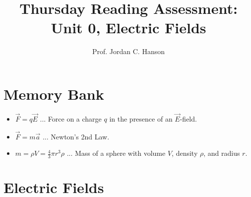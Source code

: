 \documentclass{article}
\begin{document}
\title{Thursday Reading Assessment: Unit 0, Electric Fields}
\author{Prof. Jordan C. Hanson}

\maketitle

\section{Memory Bank}

\begin{itemize}
\item $\vec{F} = q \vec{E}$ ... Force on a charge $q$ in the presence of an $\vec{E}$-field.
\item $\vec{F} = m\vec{a}$ ... Newton's 2nd Law.
\item $m = \rho V = \frac{4}{3}\pi r^3 \rho$ ... Mass of a sphere with volume $V$, density $\rho$, and radius $r$.
\end{itemize}

\section{Electric Fields}
\end{document}
